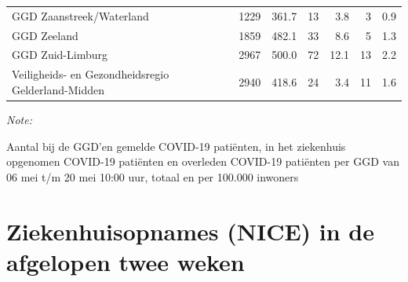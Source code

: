 \documentclass[
  english,
  man,floatsintext]{apa6}
\begin{document}
\begin{table}
\begin{threeparttable}
\begin{tabular}{lrrrrrr}
GGD Zaanstreek/Waterland & 1229 & 361.7 & 13 & 3.8 & 3 & 0.9\\
GGD Zeeland & 1859 & 482.1 & 33 & 8.6 & 5 & 1.3\\
GGD Zuid-Limburg & 2967 & 500.0 & 72 & 12.1 & 13 & 2.2\\
Veiligheids- en Gezondheidsregio Gelderland-Midden & 2940 & 418.6 & 24 & 3.4 & 11 & 1.6\\
\bottomrule
\end{tabular}
\begin{tablenotes}
\item \textit{Note: } 
\item Aantal bij de GGD’en gemelde COVID-19 patiënten, in het ziekenhuis opgenomen COVID-19 patiënten en overleden COVID-19 patiënten per GGD van 06 mei t/m 20 mei 10:00 uur, totaal en per 100.000 inwoners
\end{tablenotes}
\end{threeparttable}
\endgroup{}
\end{table}

\newpage

\hypertarget{ziekenhuisopnames-nice-in-de-afgelopen-twee-weken}{%
\section{Ziekenhuisopnames (NICE) in de afgelopen twee weken}\label{ziekenhuisopnames-nice-in-de-afgelopen-twee-weken}}
\end{document}
